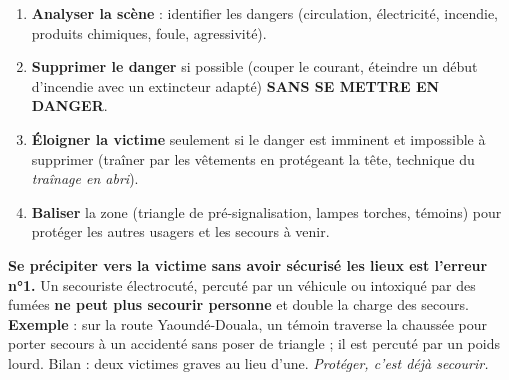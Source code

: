 \documentclass[11pt]{article}
\begin{document}
\begin{methode}
\begin{enumerate}
    \item \textbf{Analyser la scène} : identifier les dangers (circulation, électricité, incendie, produits chimiques, foule, agressivité).
    \item \textbf{Supprimer le danger} si possible (couper le courant, éteindre un début d'incendie avec un extincteur adapté) \textbf{SANS SE METTRE EN DANGER}.
    \item \textbf{Éloigner la victime} seulement si le danger est imminent et impossible à supprimer (traîner par les vêtements en protégeant la tête, technique du \emph{traînage en abri}).
    \item \textbf{Baliser} la zone (triangle de pré-signalisation, lampes torches, témoins) pour protéger les autres usagers et les secours à venir.
\end{enumerate}
\end{methode}

\begin{attention}
\textbf{Se précipiter vers la victime sans avoir sécurisé les lieux est l'erreur n°1.} Un secouriste électrocuté, percuté par un véhicule ou intoxiqué par des fumées \textbf{ne peut plus secourir personne} et double la charge des secours. \textbf{Exemple} : sur la route Yaoundé-Douala, un témoin traverse la chaussée pour porter secours à un accidenté sans poser de triangle ; il est percuté par un poids lourd. Bilan : deux victimes graves au lieu d'une. \textit{Protéger, c'est déjà secourir.}
\end{attention}
\end{document}
